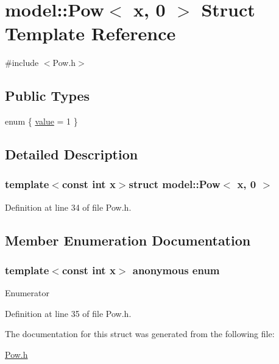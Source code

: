 \hypertarget{structmodel_1_1_pow_3_01x_00_010_01_4}{}\section{model\+:\+:Pow$<$ x, 0 $>$ Struct Template Reference}
\label{structmodel_1_1_pow_3_01x_00_010_01_4}


{\ttfamily \#include $<$Pow.\+h$>$}

\subsection*{Public Types}
\begin{DoxyCompactItemize}
\item 
enum \{ \hyperlink{structmodel_1_1_pow_3_01x_00_010_01_4_aafa01a78d900f3301acbd24240295dbda478da1782d191502f474f26856a7a327}{value} = 1
 \}
\end{DoxyCompactItemize}


\subsection{Detailed Description}
\subsubsection*{template$<$const int x$>$struct model\+::\+Pow$<$ x, 0 $>$}



Definition at line 34 of file Pow.\+h.



\subsection{Member Enumeration Documentation}
\hypertarget{structmodel_1_1_pow_3_01x_00_010_01_4_aafa01a78d900f3301acbd24240295dbd}{}\subsubsection[{anonymous enum}]{\setlength{\rightskip}{0pt plus 5cm}template$<$const int x$>$ anonymous enum}\label{structmodel_1_1_pow_3_01x_00_010_01_4_aafa01a78d900f3301acbd24240295dbd}
\begin{Desc}
\item[Enumerator]\par
\begin{description}
\item[{\em 
\hypertarget{structmodel_1_1_pow_3_01x_00_010_01_4_aafa01a78d900f3301acbd24240295dbda478da1782d191502f474f26856a7a327}{}value\label{structmodel_1_1_pow_3_01x_00_010_01_4_aafa01a78d900f3301acbd24240295dbda478da1782d191502f474f26856a7a327}
}]\end{description}
\end{Desc}


Definition at line 35 of file Pow.\+h.



The documentation for this struct was generated from the following file\+:\begin{DoxyCompactItemize}
\item 
\hyperlink{_pow_8h}{Pow.\+h}\end{DoxyCompactItemize}
